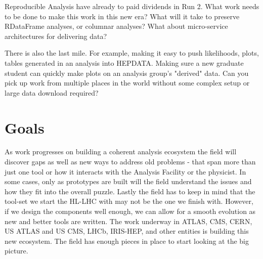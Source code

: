 \documentclass{article}
\begin{document}
Reproducible Analysis have already to paid dividends in Run 2\cite{repro-analysis-llp}. What work needs to be done to make this work in this new era? What will it take to preserve RDataFrame analyses, or columnar analyses? What about micro-service architectures for delivering data?

There is also the last mile. For example, making it easy to push likelihoods, plots, tables generated in an analysis into HEPDATA\cite{hepdata}. Making sure a new graduate student can quickly make plots on an analysis group's "derived" data. Can you pick up work from multiple places in the world without some complex setup or large data download required? 

\section*{Goals}

 As work progresses on building a coherent analysis ecosystem the field will discover gaps as well as new ways to address old problems - that span more than just one tool or how it interacts with the Analysis Facility or the physicist. In some cases, only as prototypes are built will the field understand the issues and how they fit into the overall puzzle. Lastly the field has to keep in mind that the tool-set we start the HL-LHC with may not be the one we finish with. However, if we design the components well enough, we can allow for a smooth evolution as new and better tools are written. The work underway in ATLAS, CMS, CERN, US ATLAS and US CMS, LHCb, IRIS-HEP, and other entities is building this new ecosystem. The field has enough pieces in place to start looking at the big picture.
 


\end{document}
